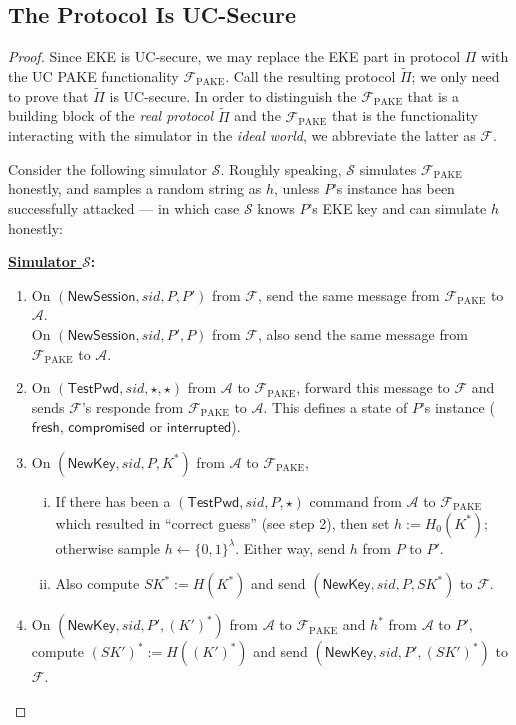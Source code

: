 \documentclass{article}
\newcommand{\adv}{\mathcal{A}}
\renewcommand{\sim}{\mathcal{S}}
\newcommand{\func}{\mathcal{F}}
\newcommand{\Fpake}{\func_\mathrm{PAKE}}
\newcommand{\NewSession}{\mathsf{NewSession}}
\newcommand{\TestPwd}{\mathsf{TestPwd}}
\newcommand{\NewKey}{\mathsf{NewKey}}
\newcommand{\fresh}{\mathsf{fresh}}
\newcommand{\compromised}{\mathsf{compromised}}
\newcommand{\interrupted}{\mathsf{interrupted}}
\begin{document}
\subsection{The Protocol Is UC-Secure}
\begin{proof}
Since EKE is UC-secure, we may replace the EKE part in protocol $\Pi$ with the UC PAKE functionality $\Fpake$. Call the resulting protocol $\tilde{\Pi}$; we only need to prove that $\tilde{\Pi}$ is UC-secure. In order to distinguish the $\Fpake$ that is a building block of the \emph{real protocol} $\tilde{\Pi}$ and the $\Fpake$ that is the functionality interacting with the simulator in the \emph{ideal world}, we abbreviate the latter as $\func$.

Consider the following simulator $\sim$. Roughly speaking, $\sim$ simulates $\Fpake$ honestly, and samples a random string as $h$, unless $P$'s instance has been successfully attacked --- in which case $\sim$ knows $P$'s EKE key and can simulate $h$ honestly:

\bigskip\noindent\textbf{\underline{Simulator $\sim$}:}
\begin{enumerate}
  \item On $(\NewSession, sid, P, P')$ from $\func$, send the same message from $\Fpake$ to $\adv$. \\
      On $(\NewSession, sid, P', P)$ from $\func$, also send the same message from $\Fpake$ to $\adv$.
  \item On $(\TestPwd, sid, \star, \star)$ from $\adv$ to $\Fpake$, forward this message to $\func$ and sends $\func$'s responde from $\Fpake$ to $\adv$. This defines a state of $P$'s instance ($\fresh$, $\compromised$ or $\interrupted$).
  \item On $(\NewKey, sid, P, K^*)$ from $\adv$ to $\Fpake$,
      \begin{enumerate}[(i)]
        \item If there has been a $(\TestPwd, sid, P, \star)$ command from $\adv$ to $\Fpake$ which resulted in ``correct guess'' (see step 2), then set $h := H_0(K^*)$; otherwise sample $h \gets \{0,1\}^\lambda$. Either way, send $h$ from $P$ to $P'$.
        \item Also compute $SK^* := H(K^*)$ and send $(\NewKey, sid, P, SK^*)$ to $\func$.
      \end{enumerate}
  \item On $(\NewKey, sid, P', (K')^*)$ from $\adv$ to $\Fpake$ and $h^*$ from $\adv$ to $P'$, compute $(SK')^* := H((K')^*)$ and send $(\NewKey, sid, P', (SK')^*)$ to $\func$.
\end{enumerate}


\end{proof}
\end{document}
